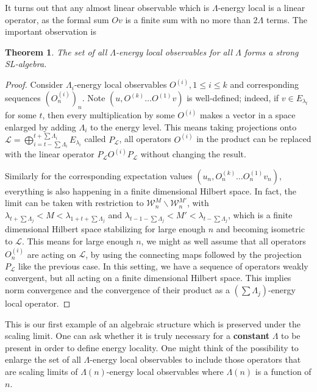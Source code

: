 \documentclass[twoside,11pt,titlepage]{amsart}
\renewcommand{\=}[1]{\stackrel{#1}{=}} %
\newtheorem{thm}{Theorem}[section]
\theoremstyle{definition}
\theoremstyle{remark}
\begin{document}
It turns out that any almost linear observable which is $\Lambda$-energy local is a linear operator, as the formal sum $Ov$ is a finite sum with no more than $2\Lambda$ terms. The important observation is
\begin{thm}\label{thm2.1}
The set of all $\Lambda$-energy local observables for all $\Lambda$ forms a strong SL-algebra.
\end{thm}
\begin{proof}
Consider $\Lambda_i$-energy local observables $O^{(i)},1\le i\le k$ and corresponding sequences $(O_n^{(i)})_n$. Note $(u,O^{(k)}\ldots O^{(1)}v)$ is well-defined; indeed, if $v \in E_{\lambda_t}$ for some $t$, then every multiplication by some $O^{(i)}$ makes a vector in a space enlarged by adding $\Lambda_i$ to the energy level. This means taking projections onto $\mathcal{L}=\bigoplus_{i=t-\sum \Lambda_i}^{t+\sum \Lambda_i}E_{\lambda_i}$ called $P_{\mathcal{L}}$, all operators $O^{(i)}$ in the product can be replaced with the linear operator $P_{\mathcal{L}}O^{(i)}P_{\mathcal{L}}$ without changing the result.

Similarly for the corresponding expectation values $(u_n,O^{(k)}_n\ldots O^{(1)}_nv_n)$, everything is also happening in a finite dimensional Hilbert space. In fact, the limit can be taken with restriction to $\mathcal{W}_n^M \backslash \mathcal{W}_n^{M'}$, with $\lambda_{t+\sum \Lambda_j}<M<\lambda_{1+t+\sum \Lambda_j}$ and $\lambda_{t-1-\sum \Lambda_j}<M'<\lambda_{t-\sum \Lambda_j}$, which is a finite dimensional Hilbert space stabilizing for large enough $n$ and becoming isometric to $\mathcal{L}$. This means for large enough $n$, we might as well assume that all operators $O^{(i)}_n$ are acting on $\mathcal{L}$, by using the connecting maps followed by the projection $P_\mathcal{L}$ like the previous case. In this setting, we have a sequence of operators weakly convergent, but all acting on a finite dimensional Hilbert space. This implies norm convergence and the convergence of their product as a $(\sum \Lambda_j)$-energy local operator.
\end{proof}

This is our first example of an algebraic structure which is preserved under the scaling limit. One can ask whether it is truly necessary for a \textbf{constant} $\Lambda$ to be present in order to define energy locality. One might think of the possibility to enlarge the set of all $\Lambda$-energy local observables to include those operators that are scaling limits of $\Lambda(n)$-energy local observables where $\Lambda(n)$ is a function of $n$. 
\end{document}
